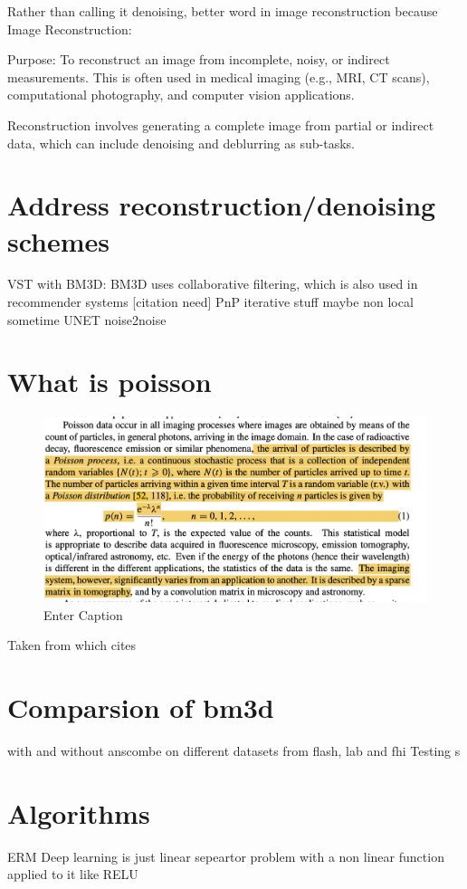 Rather than calling it denoising, better word in image reconstruction because
Image Reconstruction:

Purpose: To reconstruct an image from incomplete, noisy, or indirect measurements. This is often used in medical imaging (e.g., MRI, CT scans), computational photography, and computer vision applications. 

Reconstruction involves generating a complete image from partial or indirect data, which can include denoising and deblurring as sub-tasks.

\section{Address reconstruction/denoising schemes}
VST with BM3D: BM3D uses collaborative filtering, which is also used in recommender systems [citation need]
PnP iterative stuff
maybe non local sometime
UNET noise2noise

\section{What is poisson}

\begin{figure}
    \centering
    \includegraphics[width=1\linewidth]{images/JD-54-image.png}
    \caption{Enter Caption}
    \label{fig:enter-label}
\end{figure}

Taken from \cite{bertero_image_2009} which cites \cite{feller_introduction_1968}

\section{Comparsion of bm3d }
with and without anscombe on different datasets from flash, lab and fhi
Testing s

\section{Algorithms}

ERM 
Deep learning is just linear sepeartor problem with a non linear function applied to it like RELU